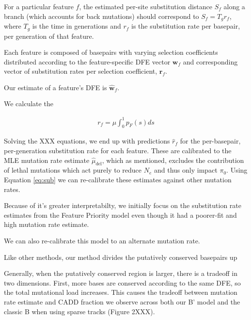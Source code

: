 \documentclass[11pt]{article}
\begin{document}
For a particular feature $f$, the estimated per-site substitution distance
$S_f$ along a branch (which accounts for back mutations) should correspond to
$S_f = T_g r_f$, where $T_g$ is the time in generations and $r_f$ is the
substitution rate per basepair, per generation of that feature. 

Each feature is
composed of basepairs with varying selection coefficients distributed according
to the feature-specific DFE vector $\mathbf{w}_f$ and corresponding vector of
substitution rates per selection coefficient, $\mathbf{r}_f$.

Our estimate of a feature's DFE
is $\widehat{\mathbf{w}}_f$.

We calculate the 


\begin{align}
    \label{eq:sub}
    r_f = \mu \int_0^1 p_F(s) ds
\end{align}

Solving the XXX equations, we end up with predictions $\widehat{r}_f$ for the
per-basepair, per-generation substitution rate for each feature. These are
calibrated to the MLE mutation rate estimate $\widehat{\mu}_\text{del}$, which
as mentioned, excludes the contribution of lethal mutations which act purely to
reduce $N_e$ and thus only impact $\pi_0$. Using Equation \eqref{eq:sub} we can
re-calibrate these estimates against other mutation rates. 

Because of it's greater interpretabilty, we initially focus on the substitution
rate estimates from the Feature Priority model even though it had a poorer-fit
and high mutation rate estimate. 

We can also re-calibrate this model to an alternate mutation rate.


Like other methods, our method divides the putatively conserved basepairs up

Generally, when the putatively conserved region is larger, there is a tradeoff
in two dimensions. First, more bases are conserved according to the same DFE,
so the total mutational load increases. This causes the tradeoff between
mutation rate estimate and CADD fraction we observe across both our B' model
and the classic B when using sparse tracks (Figure 2XXX). 
\end{document}
